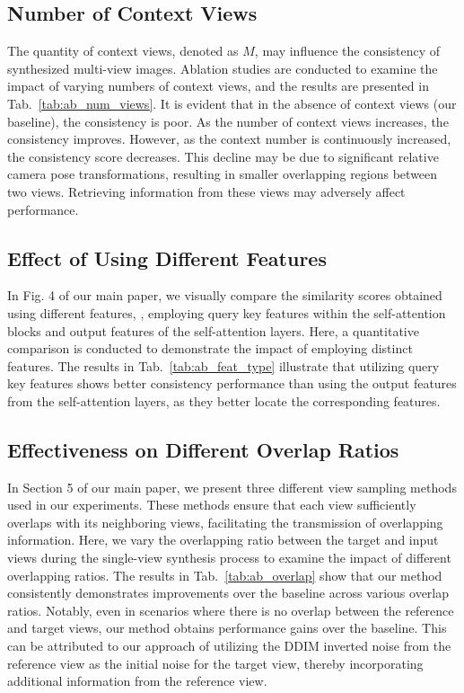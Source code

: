 \subsection{Number of Context Views}
The quantity of context views, denoted as $M$, may influence the consistency of synthesized multi-view images. Ablation studies are conducted to examine the impact of varying numbers of context views, and the results are presented in Tab.~\ref{tab:ab_num_views}. It is evident that in the absence of context views (our baseline), the consistency is poor. As the number of context views increases, the consistency improves. However, as the context number is continuously increased, the consistency score decreases. This decline may be due to significant relative camera pose transformations, resulting in smaller overlapping regions between two views. Retrieving information from these views may adversely affect performance.

\subsection{Effect of Using Different Features}
In Fig. 4 of our main paper, we visually compare the similarity scores obtained using different features, \ie, employing query key features within the self-attention blocks and output features of the self-attention layers. Here, a quantitative comparison is conducted to demonstrate the impact of employing distinct features. The results in Tab.~\ref{tab:ab_feat_type} illustrate that utilizing query key features shows better consistency performance than using the output features from the self-attention layers, as they better locate the corresponding features.


\subsection{Effectiveness on Different Overlap Ratios}
In Section 5 of our main paper, we present three different view sampling methods used in our experiments. These methods ensure that each view sufficiently overlaps with its neighboring views, facilitating the transmission of overlapping information.
Here, we vary the overlapping ratio between the target and input views during the single-view synthesis process to examine the impact of different overlapping ratios.
The results in Tab.~\ref{tab:ab_overlap} show that our method consistently demonstrates improvements over the baseline across various overlap ratios. Notably, even in scenarios where there is no overlap between the reference and target views, our method obtains performance gains over the baseline. This can be attributed to our approach of utilizing the DDIM inverted noise from the reference view as the initial noise for the target view, thereby incorporating additional information from the reference view.


